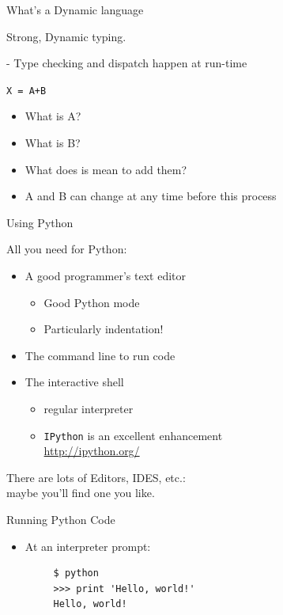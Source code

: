 \documentclass{beamer}
\begin{document}
\begin{frame}[fragile]{What's a Dynamic language}

Strong, Dynamic typing.

 - Type checking and dispatch happen at run-time

\vspace{0.25in}
{\Large \verb!X = A+B!}
\vspace{0.1in}
\begin{itemize}
\pause
  \item What is A?
  \item What is B?
  \item What does is mean to add them?
\vspace{0.2in}
\pause
  \item A and B can change at any time before this process
\end{itemize}

\end{frame} 

\begin{frame}[fragile]{Using Python}

All you need for Python:
\begin{itemize}
  \item  A good programmer's text editor
    \begin{itemize}
      \item Good Python mode
      \item Particularly indentation!
    \end{itemize}
  \item  The command line to run code
  \item  The interactive shell
    \begin{itemize}
      \item regular interpreter
      \item \verb+IPython+ is an excellent enhancement\\
        \url{http://ipython.org/}
    \end{itemize}
\end{itemize}

\vspace{.2in}
There are lots of Editors, IDES, etc.:\\
   maybe you'll find one you like.

\end{frame} 

\begin{frame}[fragile]{Running Python Code}

\begin{itemize}
  \item At an interpreter prompt:\\
   \begin{verbatim}
     $ python 
     >>> print 'Hello, world!' 
     Hello, world!
   \end{verbatim}
\end{itemize}

\end{frame} 
\end{document}
